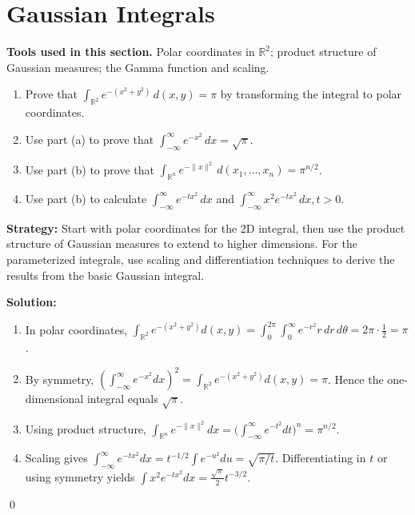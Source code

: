 \section{Gaussian Integrals}

\noindent\textbf{Tools used in this section.} Polar coordinates in \(\mathbb{R}^2\); product structure of Gaussian measures; the Gamma function and scaling.



\begin{problembox}
\begin{enumerate}[label=(\alph*)]
\item Prove that \(\int_{\mathbb{R}^2} e^{-(x^2 + y^2)} \, d(x, y) = \pi\) by transforming the integral to polar coordinates.
\item Use part (a) to prove that \(\int_{-\infty}^{\infty} e^{-x^2} \, dx = \sqrt{\pi}\).
\item Use part (b) to prove that \(\int_{\mathbb{R}^n} e^{-\|x\|^2} \, d(x_1, \ldots, x_n) = \pi^{n/2}\).
\item Use part (b) to calculate \(\int_{-\infty}^{\infty} e^{-tx^2} \, dx\) and \(\int_{-\infty}^{\infty} x^2 e^{-tx^2} \, dx, t > 0\).
\end{enumerate}
\end{problembox}

\noindent\textbf{Strategy:} Start with polar coordinates for the 2D integral, then use the product structure of Gaussian measures to extend to higher dimensions. For the parameterized integrals, use scaling and differentiation techniques to derive the results from the basic Gaussian integral.

\bigskip\noindent\textbf{Solution:}
\begin{enumerate}[label=(\alph*)]
\item In polar coordinates,
\(\int_{\mathbb{R}^2} e^{-(x^2+y^2)} d(x,y)=\int_0^{2\pi}\int_0^{\infty} e^{-r^2} r\,dr\,d\theta=2\pi\cdot\tfrac12=\pi\).
\item By symmetry, \(\left(\int_{-\infty}^{\infty} e^{-x^2}dx\right)^2=\int_{\mathbb{R}^2} e^{-(x^2+y^2)}d(x,y)=\pi\). Hence the one-dimensional integral equals \(\sqrt{\pi}\).
\item Using product structure, \(\int_{\mathbb{R}^n} e^{-\|x\|^2}dx=\big(\int_{-\infty}^{\infty} e^{-t^2}dt\big)^n=\pi^{n/2}\).
\item Scaling gives \(\int_{-\infty}^{\infty} e^{-t x^2} dx = t^{-1/2}\int e^{-u^2}du = \sqrt{\pi/t}\). Differentiating in \(t\) or using symmetry yields \(\int x^2 e^{-t x^2} dx = \tfrac{\sqrt{\pi}}{2} t^{-3/2}\).
\end{enumerate}\qed
